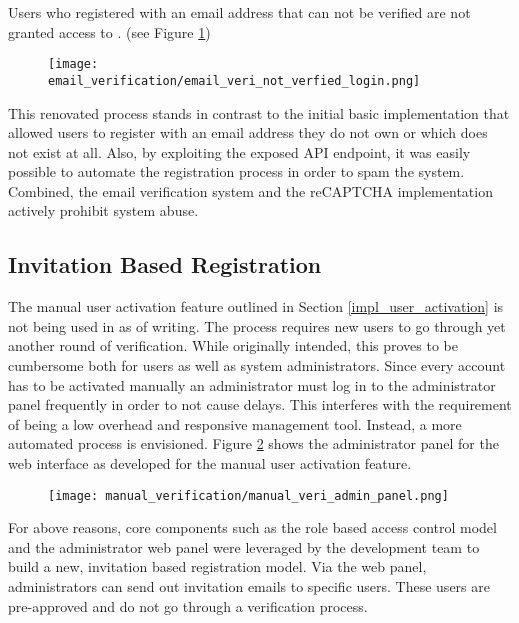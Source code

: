 Users who registered with an email address that can not be verified are not granted access to \lcs. (see Figure \ref{veri:not_verified})

\begin{figure}[h]%
	\centering
	\texttt{[image: email\_verification/email\_veri\_not\_verfied\_login.png]}
	\label{veri:not_verified}
\end{figure}

This renovated process stands in contrast to the initial basic implementation that allowed users to register with an email address they do not own or which does not exist at all. Also, by exploiting the exposed API endpoint, it was easily possible to automate the registration process in order to spam the system. Combined, the email verification system and the reCAPTCHA implementation actively prohibit system abuse.

\subsection{Invitation Based Registration}
\label{eva:invi}

The manual user activation feature outlined in Section \ref{impl_user_activation} is not being used in \lcs as of writing. The process requires new users to go through yet another round of verification. While originally intended, this proves to be cumbersome both for users as well as system administrators. Since every account has to be activated manually an administrator must log in to the administrator panel frequently in order to not cause delays. This interferes with the requirement of \lcs being a low overhead and responsive management tool. Instead, a more automated process is envisioned. Figure \ref{veri:admin_panel} shows the administrator panel for the web interface as developed for the manual user activation feature.

\begin{figure}[h] %
	\centering
	\texttt{[image: manual\_verification/manual\_veri\_admin\_panel.png]}
	\label{veri:admin_panel}
\end{figure}

For above reasons, core components such as the role based access control model and the administrator web panel were leveraged by the development team to build a new, invitation based registration model. Via the web panel, administrators can send out invitation emails to specific users. These users are pre-approved and do not go through a verification process.

